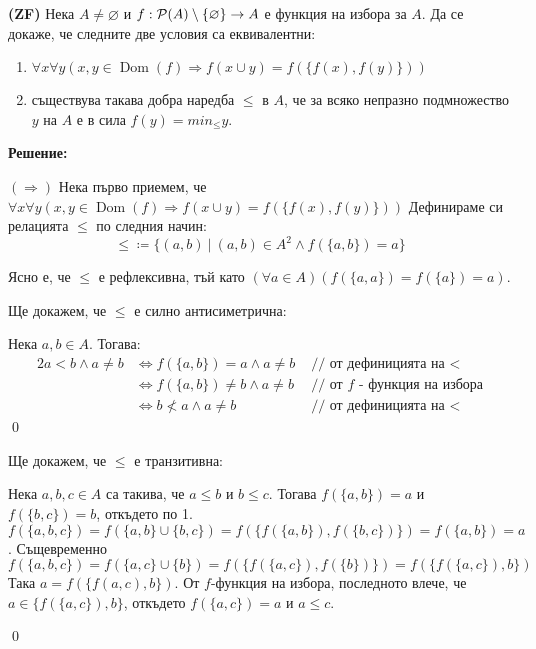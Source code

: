 \begin{problem}
\textbf{(ZF)}
Нека $A \neq \varnothing$ и $f: \mathcal{P}(A) \setminus \{\varnothing \} \to A$ е функция на избора за $A$.
Да се докаже, че следните две условия са еквивалентни:
\begin{enumerate}
\item
$\forall x \forall y (x, y \in \operatorname{Dom}(f) \Rightarrow f(x \cup y) = f(\{ f(x), f(y) \}) )$

\item
съществува такава добра наредба $\leq$ в $A$, че за всяко непразно подмножество $y$ на $A$ е в сила $f(y) = min_{\leq} y$.
\end{enumerate}

\end{problem}

\textbf{Решение:}

\smallbreak
\quad
$(\Rightarrow)$ Нека първо приемем, че
$\forall x \forall y (x, y \in \operatorname{Dom}(f) \Rightarrow f(x \cup y) = f(\{ f(x), f(y) \}) )$
Дефинираме си релацията $\leq$ по следния начин:
\[
\leq \coloneq \{ (a, b)\ |\ (a, b) \in A^2 \land f(\{a, b\}) = a \}
\]

\quad
Ясно е, че $\leq$ е рефлексивна, тъй като $(\forall a \in A)(f(\{a, a\}) = f(\{a\}) = a)$.

\quad
Ще докажем, че  $\leq$ е силно антисиметрична:

\begin{tcolorbox}[mybox, title={Доказателство:}]
\quad
Нека $a, b \in A$. Тогава:
\begin{alignat*}{2}
a < b \land a \neq b & \iff f(\{a, b\}) = a \land a \neq b        & \text{ // от дефиницията на $<$ } \\
                     & \iff f(\{a, b\}) \neq b \land a \neq b     & \text{ // от $f$ - функция на избора} \\
                     & \iff b \not< a \land a \neq b              & \text{ // от дефиницията на $<$}
\end{alignat*}
\qed
\end{tcolorbox}

\quad
Ще докажем, че  $\leq$ е транзитивна:

\begin{tcolorbox}[mybox, title={Доказателство:}]
\quad
Нека $a, b, c \in A$ са такива, че $a \leq b$ и $b \leq c$.
Тогава $f(\{a, b\}) = a$ и $f(\{b, c\}) = b$, откъдето по 1.
$f(\{a, b, c\}) = f(\{a, b\} \cup \{b, c\}) = f(\{f(\{a, b\}), f(\{b,c\})\}) = f(\{a, b\}) = a$.
Същевременно
$f(\{a, b, c\}) = f(\{a, c\} \cup \{b\}) = f(\{f(\{a, c\}), f(\{b\})\}) = f(\{f(\{a, c\}), b\})$
Така $a = f(\{f(a, c), b\})$.
От $f$-функция на избора, последното влече, че $a \in \{f(\{a, c\}), b\}$,
откъдето $f(\{a, c\}) = a$ и $a \leq c$.

\qed
\end{tcolorbox}

